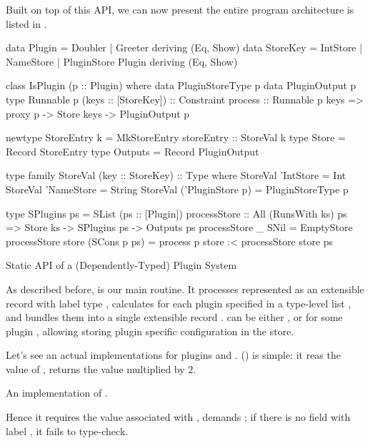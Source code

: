 \documentclass[demotion-paper.tex]{subfiles}
\begin{document}
Built on top of this API, we can now present the entire program architecture is listed in .
\begin{listing}[hptb]
\begin{code}
data Plugin = Doubler | Greeter deriving (Eq, Show)
data StoreKey = IntStore | NameStore | PluginStore Plugin deriving (Eq, Show)

class IsPlugin (p :: Plugin) where
  data PluginStoreType p
  data PluginOutput p
  type Runnable p (keys :: [StoreKey]) :: Constraint
  process :: Runnable p keys => proxy p -> Store keys -> PluginOutput p

newtype StoreEntry k = MkStoreEntry {storeEntry :: StoreVal k}
type Store = Record StoreEntry
type Outputs = Record PluginOutput

type family StoreVal (key :: StoreKey) :: Type where
  StoreVal 'IntStore = Int
  StoreVal 'NameStore = String
  StoreVal ('PluginStore p) = PluginStoreType p

type SPlugins ps = SList (ps :: [Plugin])
processStore :: All (RunsWith ks) ps => Store ks -> SPlugins ps -> Outputs ps
processStore _ SNil = EmptyStore
processStore store (SCons p ps) = process p store :< processStore store ps
\end{code}
\caption{Static API of a (Dependently-Typed) Plugin System}
\label{lst:plugin-arch}
\end{listing}
As described before,  is our main routine.
It processes  represented as an extensible record with label type , calculates  for each plugin specified in a type-level list , and bundles them into a single extensible record .
 can be either ,  or  for some plugin , allowing storing plugin specific configuration in the store.

Let's see an actual implementations for plugins  and .
 () is simple: it reas the value of , returns the value multiplied by $2$.
\begin{listing}[htbp]
\caption{An implementation of .}
\label{lst:plugin-double}
\end{listing}
Hence it requires the value associated with ,  demands ; if there is no field with label , it fails to type-check.
\end{document}
